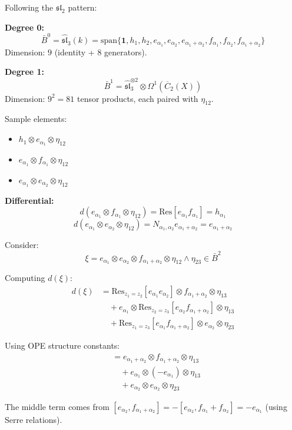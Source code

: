\begin{construction}
Following the $\mathfrak{sl}_2$ pattern:

\textbf{Degree 0:} 
$$\bar{B}^0 = \widehat{\mathfrak{sl}}_3(k) = \text{span}\{\mathbf{1}, h_1, h_2, e_{\alpha_1}, e_{\alpha_2}, e_{\alpha_1+\alpha_2}, f_{\alpha_1}, f_{\alpha_2}, f_{\alpha_1+\alpha_2}\}$$
Dimension: $9$ (identity + $8$ generators).

\textbf{Degree 1:}
$$\bar{B}^1 = \widehat{\mathfrak{sl}}_3^{\otimes 2} \otimes \Omega^1(\overline{C}_2(X))$$
Dimension: $9^2 = 81$ tensor products, each paired with $\eta_{12}$.

Sample elements:
\begin{itemize}
\item $h_1 \otimes e_{\alpha_1} \otimes \eta_{12}$
\item $e_{\alpha_1} \otimes f_{\alpha_1} \otimes \eta_{12}$
\item $e_{\alpha_1} \otimes e_{\alpha_2} \otimes \eta_{12}$
\end{itemize}

\textbf{Differential:}
$$d(e_{\alpha_1} \otimes f_{\alpha_1} \otimes \eta_{12}) = \text{Res}[e_{\alpha_1} f_{\alpha_1}] = h_{\alpha_1}$$
$$d(e_{\alpha_1} \otimes e_{\alpha_2} \otimes \eta_{12}) = N_{\alpha_1,\alpha_2} e_{\alpha_1+\alpha_2} = e_{\alpha_1+\alpha_2}$$
\end{construction}

\begin{computation}
Consider:
$$\xi = e_{\alpha_1} \otimes e_{\alpha_2} \otimes f_{\alpha_1+\alpha_2} \otimes \eta_{12} \wedge \eta_{23} \in \bar{B}^2$$

Computing $d(\xi)$:
\begin{align*}
d(\xi) &= \text{Res}_{z_1=z_2}[e_{\alpha_1} e_{\alpha_2}] \otimes f_{\alpha_1+\alpha_2} \otimes \eta_{13} \\
&\quad + e_{\alpha_1} \otimes \text{Res}_{z_2=z_3}[e_{\alpha_2} f_{\alpha_1+\alpha_2}] \otimes \eta_{13} \\
&\quad + \text{Res}_{z_1=z_3}[e_{\alpha_1} f_{\alpha_1+\alpha_2}] \otimes e_{\alpha_2} \otimes \eta_{23}
\end{align*}

Using OPE structure constants:
\begin{align*}
&= e_{\alpha_1+\alpha_2} \otimes f_{\alpha_1+\alpha_2} \otimes \eta_{13} \\
&\quad + e_{\alpha_1} \otimes (-e_{\alpha_1}) \otimes \eta_{13} \\
&\quad + e_{\alpha_2} \otimes e_{\alpha_2} \otimes \eta_{23}
\end{align*}

The middle term comes from $[e_{\alpha_2}, f_{\alpha_1+\alpha_2}] = -[e_{\alpha_2}, f_{\alpha_1}+f_{\alpha_2}] = -e_{\alpha_1}$ (using Serre relations).
\end{computation}

